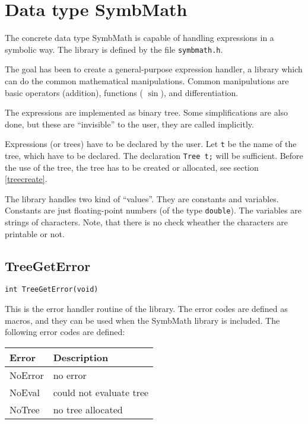 \newpage
\section{Data type SymbMath}
\label{symbmath}
The concrete data type SymbMath is capable of handling expressions in 
a symbolic way. The library is defined by the file {\tt symbmath.h}. 

The goal has been to create a general-purpose expression handler, \ie
a library which can do the common mathematical manipulations. Common
manipulutions are basic operators (\eg addition), functions (\eg
$\sin$), and differentiation.

The expressions are  implemented as binary tree. Some simplifications 
are also done, but these are ``invisible'' to the user, \ie they are 
called implicitly. 

Expressions (or trees) have to be declared by the user. Let {\tt t} 
be the name of the tree, which have to be declared. The declaration 
{\tt Tree t;} will be sufficient. Before
the use of the tree, the tree has to be created or allocated, see
section \ref{treecreate}. 

The library handles two kind of ``values''. They are constants and
variables. Constants are just 
floating-point numbers (of the type {\tt double}). The variables are
strings of characters. 
Note, that there is no check wheather the characters are printable or
not. 

\subsection{TreeGetError}
\begin{verbatim}
int TreeGetError(void)
\end{verbatim}

This is the error handler routine of the library. The error codes are 
defined as macros, and they can
be used when the SymbMath library is included. The following error 
codes are defined:

\vspace{0.2cm}
\begin{center}
\begin{tabular}{ll}
\hline
  Error     & Description \\ \hline 
  NoError   & no error    \\ 
  NoEval    & could not evaluate tree \\ 
  NoTree    & no tree allocated \\
\hline
\end{tabular}
\end{center}
\vspace{0.2cm}

